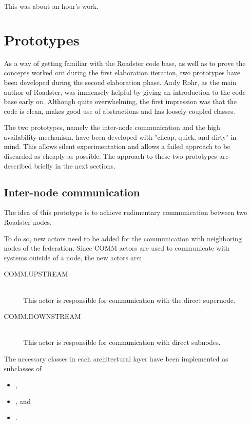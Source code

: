 This was about an hour's work.


\section{Prototypes}\label{sec:approach:prototypes}
As a way of getting familiar with the Roadster code base, as well as to prove
the concepts worked out during the first elaboration iteration, two prototypes have
been developed during the second elaboration phase. Andy Rohr, as the
main author of Roadster, was immensely helpful by giving an introduction to
the code base early on.  Although quite overwhelming, the first impression was
that the code is clean, makes good use of abstractions and has loosely coupled
classes.


The two prototypes, namely the inter-node communication and the high availability
mechanism, have been developed with "cheap, quick, and dirty" in mind. This
allows silent experimentation and allows a failed approach to be discarded as
cheaply as possible.
The approach to these two prototypes are described briefly in the next sections.


\subsection{Inter-node communication}
The idea of this prototype is to achieve rudimentary communication between two
Roadster nodes.

To do so, new actors need to be added for the communication with neighboring nodes of the
federation.  Since COMM actors are used to communicate with systems outside of
a node, the new actors are:
\begin{description}
\item [COMM.UPSTREAM]\hfill\\
This actor is responsible for communication with the direct supernode.
\item [COMM.DOWNSTREAM]\hfill\\
This actor is responsible for communication with direct subnodes.
\end{description}

The necessary classes in each architectural layer have been implemented as
subclasses of
\begin{itemize}
\item {},
\item {}, and
\item {}.
\end{itemize}



